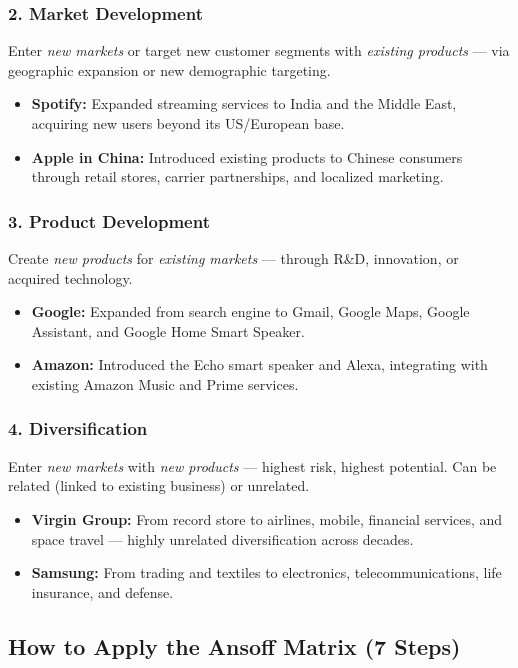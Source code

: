 \documentclass[11pt, letterpaper]{article}
\begin{document}
\subsubsection{2. Market Development}
Enter \textit{new markets} or target new customer segments with \textit{existing products} --- via geographic expansion or new demographic targeting.
\begin{itemize}[leftmargin=*]
  \item \textbf{Spotify:} Expanded streaming services to India and the Middle East, acquiring new users beyond its US/European base.
  \item \textbf{Apple in China:} Introduced existing products to Chinese consumers through retail stores, carrier partnerships, and localized marketing.
\end{itemize}

\subsubsection{3. Product Development}
Create \textit{new products} for \textit{existing markets} --- through R\&D, innovation, or acquired technology.
\begin{itemize}[leftmargin=*]
  \item \textbf{Google:} Expanded from search engine to Gmail, Google Maps, Google Assistant, and Google Home Smart Speaker.
  \item \textbf{Amazon:} Introduced the Echo smart speaker and Alexa, integrating with existing Amazon Music and Prime services.
\end{itemize}

\subsubsection{4. Diversification}
Enter \textit{new markets} with \textit{new products} --- highest risk, highest potential. Can be related (linked to existing business) or unrelated.
\begin{itemize}[leftmargin=*]
  \item \textbf{Virgin Group:} From record store to airlines, mobile, financial services, and space travel --- highly unrelated diversification across decades.
  \item \textbf{Samsung:} From trading and textiles to electronics, telecommunications, life insurance, and defense.
\end{itemize}

\subsection{How to Apply the Ansoff Matrix (7 Steps)}
\end{document}
